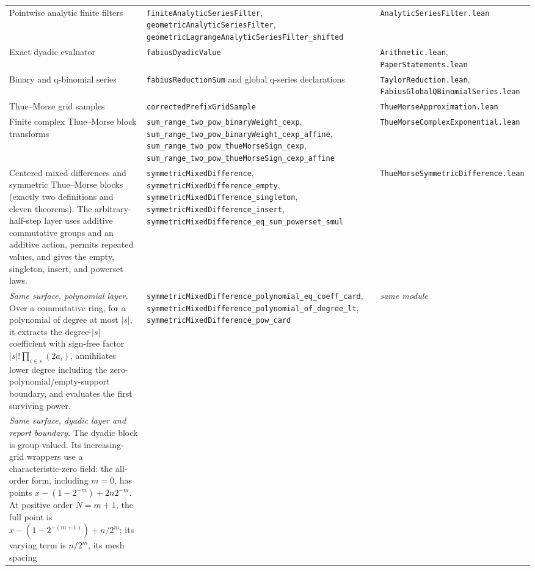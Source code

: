 \documentclass[11pt,oneside]{article}
\theoremstyle{definition}
\theoremstyle{remark}
\begin{document}
\begin{longtable}{@{}p{}p{}p{}@{}}
Pointwise analytic finite filters &
\nolinkurl{finiteAnalyticSeriesFilter},
\nolinkurl{geometricAnalyticSeriesFilter},
\nolinkurl{geometricLagrangeAnalyticSeriesFilter_shifted} &
\nolinkurl{AnalyticSeriesFilter.lean} \\
Exact dyadic evaluator & \nolinkurl{fabiusDyadicValue} & \nolinkurl{Arithmetic.lean}, \nolinkurl{PaperStatements.lean} \\
Binary and q-binomial series & \nolinkurl{fabiusReductionSum} and global q-series declarations & \nolinkurl{TaylorReduction.lean}, \nolinkurl{FabiusGlobalQBinomialSeries.lean} \\
Thue--Morse grid samples & \nolinkurl{correctedPrefixGridSample} & \nolinkurl{ThueMorseApproximation.lean} \\
Finite complex Thue--Morse block transforms &
\nolinkurl{sum_range_two_pow_binaryWeight_cexp},
\nolinkurl{sum_range_two_pow_binaryWeight_cexp_affine},
\nolinkurl{sum_range_two_pow_thueMorseSign_cexp},
\nolinkurl{sum_range_two_pow_thueMorseSign_cexp_affine} &
\nolinkurl{ThueMorseComplexExponential.lean} \\
Centered mixed differences and symmetric Thue--Morse blocks (exactly two
definitions and eleven theorems).  The arbitrary-half-step layer uses
additive commutative groups and an additive action, permits repeated values,
and gives the empty, singleton, insert, and powerset laws. &
\nolinkurl{symmetricMixedDifference},
\nolinkurl{symmetricMixedDifference_empty},
\nolinkurl{symmetricMixedDifference_singleton},
\nolinkurl{symmetricMixedDifference_insert},
\nolinkurl{symmetricMixedDifference_eq_sum_powerset_smul} &
\nolinkurl{ThueMorseSymmetricDifference.lean} \\
\emph{Same surface, polynomial layer.}  Over a commutative ring, for a
polynomial of degree at most \(|s|\), it extracts the degree-\(|s|\)
coefficient with sign-free factor
\(|s|!\prod_{i\in s}(2a_i)\), annihilates lower degree including the
zero-polynomial/empty-support boundary, and evaluates the first surviving
power. &
\nolinkurl{symmetricMixedDifference_polynomial_eq_coeff_card},
\nolinkurl{symmetricMixedDifference_polynomial_of_degree_lt},
\nolinkurl{symmetricMixedDifference_pow_card} &
\emph{same module} \\
\emph{Same surface, dyadic layer and report boundary.}  The dyadic block is
group-valued.  Its increasing-grid wrappers use a characteristic-zero field:
the all-order form, including \(m=0\), has points
\(x-(1-2^{-m})+2n2^{-m}\).  At positive order \(N=m+1\), the full point is
\(x-(1-2^{-(m+1)})+n/2^m\); its varying term is \(n/2^m\), its mesh spacing

\end{longtable}
\end{document}
